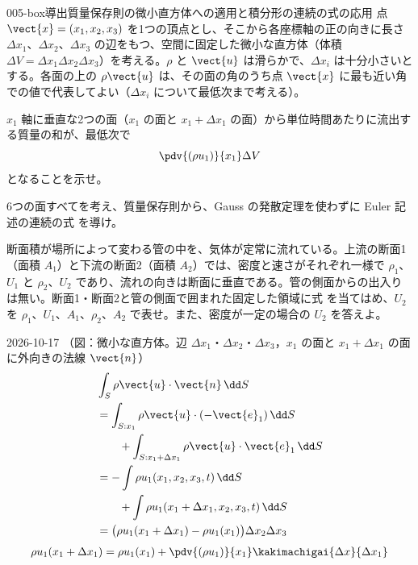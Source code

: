 \documentclass[uplatex,dvipdfmx,a4paper,11pt]{jsarticle}
\begin{document}
\begin{mondai}{005-box}{導出}{質量保存則の微小直方体への適用と積分形の連続の式の応用}
点 $\vect{x} = (x_1, x_2, x_3)$ を1つの頂点とし、そこから各座標軸の正の向きに長さ $\Delta x_1$、$\Delta x_2$、$\Delta x_3$ の辺をもつ、空間に固定した微小な直方体（体積 $\Delta V = \Delta x_1\Delta x_2\Delta x_3$）を考える。$\rho$ と $\vect{u}$ は滑らかで、$\Delta x_i$ は十分小さいとする。各面の上の $\rho\vect{u}$ は、その面の角のうち点 $\vect{x}$ に最も近い角での値で代表してよい（$\Delta x_i$ について最低次まで考える）。
  \begin{shoumon}
    \item $x_1$ 軸に垂直な2つの面（$x_1$ の面と $x_1+\Delta x_1$ の面）から単位時間あたりに流出する質量の和が、最低次で
    \[ \pdv{(\rho u_1)}{x_1}\Delta V \]
    となることを示せ。
    \item 6つの面すべてを考え、質量保存則から、Gauss の発散定理を使わずに Euler 記述の連続の式  を導け。
    \item 断面積が場所によって変わる管の中を、気体が定常に流れている。上流の断面1（面積 $A_1$）と下流の断面2（面積 $A_2$）では、密度と速さがそれぞれ一様で $\rho_1$、$U_1$ と $\rho_2$、$U_2$ であり、流れの向きは断面に垂直である。管の側面からの出入りは無い。断面1・断面2と管の側面で囲まれた固定した領域に式  を当てはめ、$U_2$ を $\rho_1$、$U_1$、$A_1$、$\rho_2$、$A_2$ で表せ。また、密度が一定の場合の $U_2$ を答えよ。
  \end{shoumon}
\begin{kotaeutsushi}{2026-10-17}
（図：微小な直方体。辺 $\Delta x_{1}$・$\Delta x_{2}$・$\Delta x_{3}$，$x_{1}$ の面と $x_{1}+\Delta x_{1}$ の面に外向きの法線 $\vect{n}$）
\begin{align*}
&\int_{S}\rho\vect{u}\cdot\vect{n}\,\dd S\\
&=\int_{S:x_{1}}\rho\vect{u}\cdot(-\vect{e}_{1})\,\dd S\\
&\qquad+\int_{S:x_{1}+\Delta x_{1}}\rho\vect{u}\cdot\vect{e}_{1}\,\dd S\\
&=-\int\rho u_{1}(x_{1},x_{2},x_{3},t)\,\dd S\\
&\qquad+\int\rho u_{1}(x_{1}+\Delta x_{1},x_{2},x_{3},t)\,\dd S\\
&=\bigl(\rho u_{1}(x_{1}+\Delta x_{1})-\rho u_{1}(x_{1})\bigr)\Delta x_{2}\Delta x_{3}
\end{align*}
\begin{align*}
\rho u_{1}(x_{1}+\Delta x_{1})&=\rho u_{1}(x_{1})+\pdv{(\rho u_{1})}{x_{1}}\kakimachigai{\Delta x}{\Delta x_{1}}\\

\end{align*}
\end{kotaeutsushi}
\end{mondai}
\end{document}
